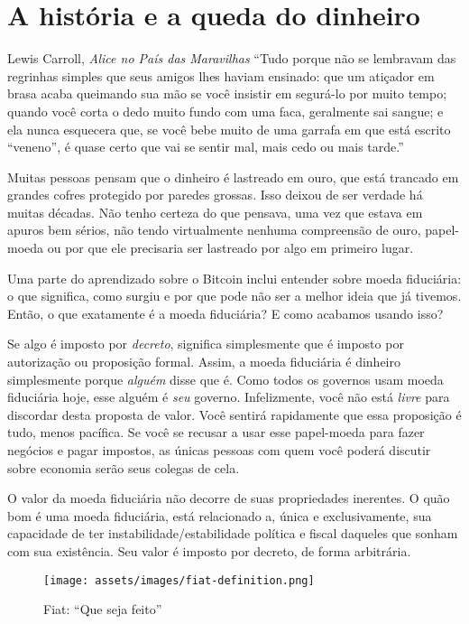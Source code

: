 \chapter{A história e a queda do dinheiro}
\label{les:12}

\begin{chapquote}{Lewis Carroll, \textit{Alice no País das Maravilhas}}
\enquote{Tudo porque não se lembravam das regrinhas simples que seus amigos lhes haviam ensinado: que um atiçador em brasa acaba queimando sua mão se você insistir em segurá-lo por muito tempo; quando você corta o dedo muito fundo com uma faca, geralmente sai sangue; e ela nunca esquecera que, se você bebe muito de uma garrafa em que está escrito “veneno”, é quase certo que vai se sentir mal, mais cedo ou mais tarde.}
\end{chapquote}

Muitas pessoas pensam que o dinheiro é lastreado em ouro, que está trancado em grandes cofres protegido por paredes grossas. Isso deixou de ser verdade há muitas décadas. Não tenho certeza do que pensava, uma vez que estava em apuros bem sérios, não tendo virtualmente nenhuma compreensão de ouro, papel-moeda ou por que ele precisaria ser lastreado por algo em primeiro lugar.

Uma parte do aprendizado sobre o Bitcoin inclui entender sobre moeda fiduciária: o que significa, como surgiu e por que pode não ser a melhor ideia que já tivemos. Então, o que exatamente é a moeda fiduciária? E como acabamos usando isso?

Se algo é imposto por \textit{decreto}, significa simplesmente que é imposto por autorização ou proposição formal. Assim, a moeda fiduciária é dinheiro simplesmente porque \textit{alguém} disse que é. Como todos os governos usam moeda fiduciária hoje, esse alguém é \textit{seu} governo. Infelizmente, você não está \textit{livre} para discordar desta proposta de valor. Você sentirá rapidamente que essa proposição é tudo, menos pacífica. Se você se recusar a usar esse papel-moeda para fazer negócios e pagar impostos, as únicas pessoas com quem você poderá discutir sobre economia serão seus colegas de cela.

O valor da moeda fiduciária não decorre de suas propriedades inerentes. O quão bom é uma moeda fiduciária, está relacionado a, única e exclusivamente, sua capacidade de ter instabilidade/estabilidade política e fiscal daqueles que sonham com sua existência. Seu valor é imposto por decreto, de forma arbitrária.

\begin{figure}
  \centering
  \texttt{[image: assets/images/fiat-definition.png]}
  \caption{Fiat: \enquote{Que seja feito}}
  \label{fig:fiat-definition}
\end{figure}

